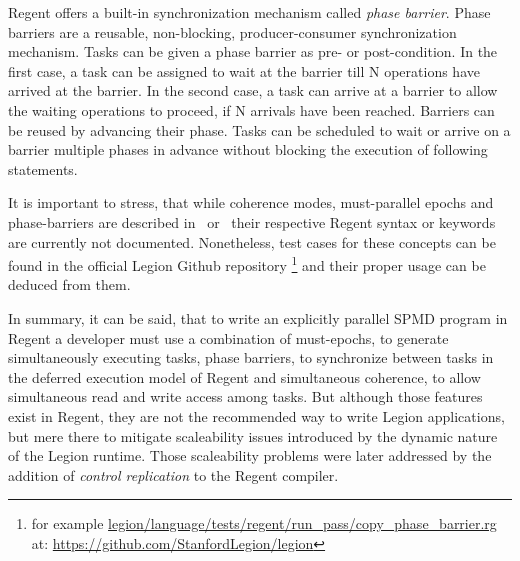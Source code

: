 \documentclass{article}      %
\begin{document}
Regent offers a built-in synchronization mechanism called \emph{phase barrier}. Phase barriers are a reusable, non-blocking, producer-consumer synchronization mechanism. Tasks can be given a phase barrier as pre- or post-condition. In the first case, a task can be assigned to wait at the barrier till N operations have arrived at the barrier. In the second case, a task can arrive at a barrier to allow the waiting operations to proceed, if N arrivals have been reached. Barriers can be reused by advancing their phase. Tasks can be scheduled to wait or arrive on a barrier multiple phases in advance without blocking the execution of following statements.

It is important to stress, that while coherence modes, must-parallel epochs and phase-barriers are described in~\cite{SlaughterThesis} or~\cite{BauerThesis} their respective Regent syntax or keywords are currently not documented. Nonetheless, test cases for these concepts can be found in the official Legion Github repository 
\footnote{for example \url{legion/language/tests/regent/run_pass/copy_phase_barrier.rg} at: \url{https://github.com/StanfordLegion/legion}} and their proper usage can be deduced from them.

In summary, it can be said, that to write an explicitly parallel SPMD program in Regent a developer must use a combination of must-epochs, to generate simultaneously executing tasks, phase barriers, to synchronize between tasks in the deferred execution model of Regent and simultaneous coherence, to allow simultaneous read and write access among tasks. But although those features exist in Regent, they are not the recommended way to write Legion applications, but mere there to mitigate scaleability issues introduced by the dynamic nature of the Legion runtime. Those scaleability problems were later addressed by the addition of \emph{control replication} to the Regent compiler.
\end{document}
